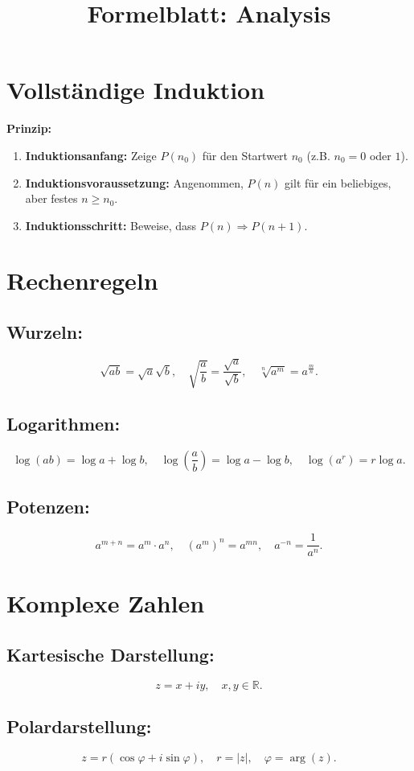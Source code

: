 \documentclass[12pt]{article}
\title{Formelblatt: Analysis}
\author{}
\date{}
\begin{document}
\maketitle

\section{Vollständige Induktion}
\textbf{Prinzip:}
\begin{enumerate}[label=\arabic*.]
  \item \textbf{Induktionsanfang:} Zeige \(P(n_0)\) für den Startwert \(n_0\) (z.B. \(n_0=0\) oder \(1\)).
  \item \textbf{Induktionsvoraussetzung:} Angenommen, \(P(n)\) gilt für ein beliebiges, aber festes \(n \ge n_0\).
  \item \textbf{Induktionsschritt:} Beweise, dass \(P(n) \Rightarrow P(n+1)\).
\end{enumerate}

\section{Rechenregeln}
\subsection*{Wurzeln:}
\[
\sqrt{ab} = \sqrt{a}\sqrt{b}, \quad \sqrt{\frac{a}{b}} = \frac{\sqrt{a}}{\sqrt{b}}, \quad \sqrt[n]{a^m} = a^{\frac{m}{n}}.
\]
\subsection*{Logarithmen:}
\[
\log(ab) = \log a + \log b, \quad \log\left(\frac{a}{b}\right) = \log a - \log b, \quad \log(a^r)=r\log a.
\]
\subsection*{Potenzen:}
\[
a^{m+n} = a^m \cdot a^n, \quad (a^m)^n = a^{mn}, \quad a^{-n} = \frac{1}{a^n}.
\]

\section{Komplexe Zahlen}
\subsection*{Kartesische Darstellung:}
\[
z = x + iy,\quad x,y \in \mathbb{R}.
\]
\subsection*{Polardarstellung:}
\[
z = r (\cos\varphi + i \sin\varphi),\quad r=|z|,\quad \varphi=\arg(z).
\]
\end{document}
